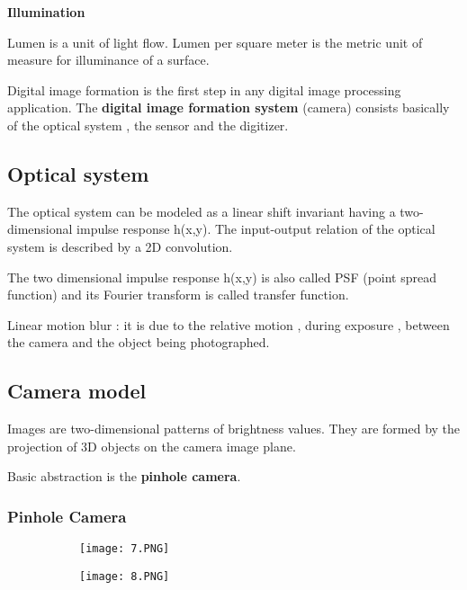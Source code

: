 \documentclass{article}
\begin{document}
\textbf{Illumination}
\vspace{3mm}

Lumen is a unit of light flow.
Lumen per square meter is the metric unit of measure for illuminance of a surface.


Digital image formation is the first step in any digital image processing application. The \textbf{digital image formation system} (camera) consists basically of the optical system , the sensor and the digitizer.

\subsection{Optical system}

The optical system can be modeled as a linear shift invariant having a two-dimensional impulse response h(x,y).
The input-output relation of the optical system is described by a 2D convolution.

The two dimensional impulse response h(x,y) is also called PSF (point spread function) and its Fourier transform is called transfer function.

Linear motion blur : it is due to the relative motion , during exposure , between the camera and the object being photographed.


\subsection{Camera model}

Images are two-dimensional patterns of brightness values. They are formed by the projection of 3D objects on the camera image plane.

Basic abstraction is the \textbf{pinhole camera}.

\subsubsection{Pinhole Camera}

\begin{figure}[ht!]
  \centering
  \begin{subfigure}[b]{0.4\linewidth}
    \texttt{[image: 7.PNG]}
  \end{subfigure}
  \begin{subfigure}[b]{0.4\textwidth}
         \centering
         \texttt{[image: 8.PNG]}
     \end{subfigure}
\end{figure}
\end{document}
